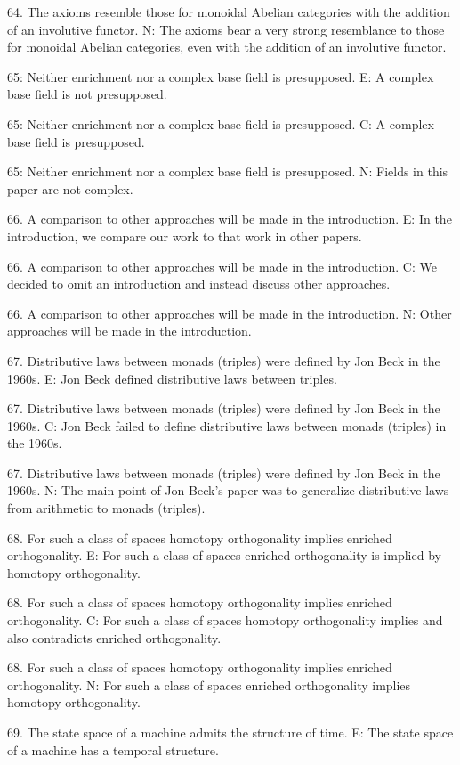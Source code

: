 64. The axioms resemble those for monoidal Abelian categories with the addition of an involutive functor.
N: The axioms bear a very strong resemblance to those for monoidal Abelian categories, even with the addition of an involutive functor.

65: Neither enrichment nor a complex base field is presupposed.
E: A complex base field is not presupposed.

65: Neither enrichment nor a complex base field is presupposed.
C: A complex base field is presupposed.

65: Neither enrichment nor a complex base field is presupposed.
N: Fields in this paper are not complex.

66. A comparison to other approaches will be made in the introduction.
E:  In the introduction, we compare our work to that work in other papers.

66. A comparison to other approaches will be made in the introduction.
C:  We decided to omit an introduction and instead discuss other approaches.

66. A comparison to other approaches will be made in the introduction.
N:  Other approaches will be made in the introduction.

67. Distributive laws between monads (triples) were defined by Jon Beck in the 1960s.
E: Jon Beck defined distributive laws between triples.

67. Distributive laws between monads (triples) were defined by Jon Beck in the 1960s.
C: Jon Beck failed to define distributive laws between monads (triples) in the 1960s.

67. Distributive laws between monads (triples) were defined by Jon Beck in the 1960s.
N: The main point of Jon Beck's paper was to generalize distributive laws from arithmetic to monads (triples).

68. For such a class of spaces homotopy orthogonality implies enriched orthogonality.
E: For such a class of spaces enriched orthogonality is implied by homotopy orthogonality.

68. For such a class of spaces homotopy orthogonality implies enriched orthogonality.
C: For such a class of spaces homotopy orthogonality implies and also contradicts enriched orthogonality.

68. For such a class of spaces homotopy orthogonality implies enriched orthogonality.
N: For such a class of spaces enriched orthogonality implies homotopy orthogonality.

69. The state space of a machine admits the structure of time.
E:  The state space of a machine has a temporal structure.

